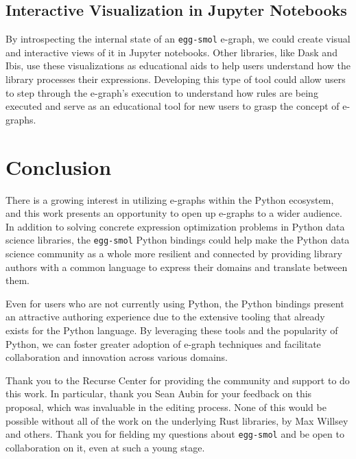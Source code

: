 \documentclass[sigplan,screen,review]{acmart}
\begin{document}
\subsection{Interactive Visualization in Jupyter Notebooks}
By introspecting the internal state of an \verb|egg-smol| e-graph, we could create visual and interactive views of it in Jupyter notebooks. Other libraries, like Dask and Ibis, use these visualizations as educational aids to help users understand how the library processes their expressions. Developing this type of tool could allow users to step through the e-graph's execution to understand how rules are being executed and serve as an educational tool for new users to grasp the concept of e-graphs.

\section{Conclusion}
There is a growing interest in utilizing e-graphs within the Python ecosystem, and this work presents an opportunity to open up e-graphs to a wider audience. In addition to solving concrete expression optimization problems in Python data science libraries, the \verb|egg-smol| Python bindings could help make the Python data science community as a whole more resilient and connected by providing library authors with a common language to express their domains and translate between them.

Even for users who are not currently using Python, the Python bindings present an attractive authoring experience due to the extensive tooling that already exists for the Python language. By leveraging these tools and the popularity of Python, we can foster greater adoption of e-graph techniques and facilitate collaboration and innovation across various domains.

\begin{acks}
Thank you to the Recurse Center for providing the community and support to do this work. In particular, thank you Sean Aubin for your feedback on this proposal, which was invaluable in the editing process. None of this would be possible without all of the work on the underlying Rust libraries, by Max Willsey and others. Thank you for fielding my questions about \verb|egg-smol| and be open to collaboration on it, even at such a young stage.

\end{acks}




\end{document}
